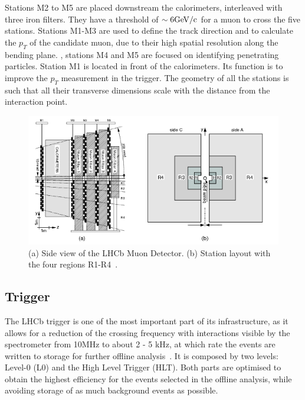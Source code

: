 Stations M2 to M5 are placed downstream the calorimeters, interleaved with three iron filters. They have a threshold of $\sim 6 \rm GeV/c$ for a muon to cross the five stations. Stations M1-M3 are used to define the track direction and to calculate the $p_T$ of the candidate muon, due to their high spatial resolution along the bending plane. , stations M4 and M5 are focused on identifying penetrating particles. Station M1 is located in front of the calorimeters. Its function is to improve the $p_T$ measurement in the trigger. The geometry of all the stations is such that all their transverse dimensions scale with the distance from the interaction point. %



\begin{figure} [htb!]
\begin{center}
\includegraphics[scale=1.0]{figs/MUON.png}
\caption{(a) Side view of the LHCb Muon Detector. (b) Station layout with the four regions R1-R4~\cite{Alves:2012ey}.\label{fig:lhcb_muon}}
\end{center}
\end{figure}

\subsection{Trigger} 
\label{sec:Trigger}
The LHCb trigger is one of the most important part of its infrastructure, as it allows for a reduction of the crossing frequency with interactions visible by the spectrometer from 10MHz to about 2 - 5 kHz, at which rate the events are written to storage for further offline analysis~\cite{Alves:2008zz}. It is composed by two levels: Level-0 (L0) and the High Level Trigger (HLT). Both parts are optimised to obtain the highest efficiency for the events selected in the offline analysis, while avoiding storage of as much background events as possible. 

